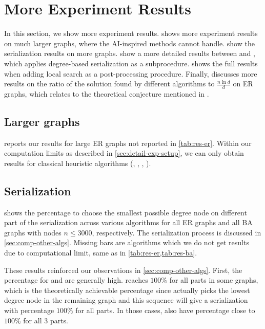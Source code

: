 \section{More Experiment Results}\label{sec:more-exp}
In this section, we show more experiment results.  shows more experiment results on much larger graphs, where the AI-inspired methods cannot handle.  show the serialization results on more graphs.  show a more detailed results between \lwd and \deggreedy, which applies degree-based serialization as a subprocedure.  shows the full results when adding local search as a post-processing procedure. Finally,  discusses more results on the ratio of the solution found by different algorithms to $\frac{n\ln d}{d}$ on ER graphs, which relates to the theoretical conjecture mentioned in .

\subsection{Larger graphs}\label{sec:more-exp-larger-graph}
 reports our results for large ER graphs not reported in \cref{tab:res-er}. Within our computation limits as described in \cref{sec:detail-exp-setup}, we can only obtain results for classical heuristic algorithms (\rangreedy, \deggreedy, \onlinemis, \redumis).


\subsection{Serialization}\label{sec:more-exp-serialization}
 shows the percentage to choose the smallest possible degree node on different part of the serialization across various algorithms for all ER graphs and all BA graphs with nodes $n\leq 3000$, respectively. The serialization process is discussed in \cref{sec:comp-other-algs}. Missing bars are algorithms which we do not get results due to computational limit, same as in \cref{tab:res-er,tab:res-ba}.



These results reinforced our observations in \cref{sec:comp-other-algs}. First, the percentage for \deggreedy and \gflownets are generally high. \deggreedy reaches $100\%$ for all parts in some graphs, which is the theoretically achievable percentage since \deggreedy actually picks the lowest degree node in the remaining graph and this sequence will give a serialization with percentage $100\%$ for all parts. In those cases, \gflownets also have percentage close to $100\%$ for all $3$ parts.

